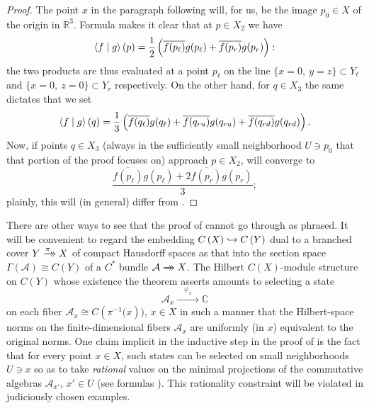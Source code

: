\documentclass[11pt,leqno]{article}
\theoremstyle{plain}
\theoremstyle{plain}
\theoremstyle{plain}
\numberwithin{equation}{section}
\theoremstyle{nonumberplain}
\newtheorem{proof}{Proof}
\newcommand\bC{{\mathbb C}}
\newcommand\bR{{\mathbb R}}
\newcommand\cA{{\mathcal A}}
\newcommand\1{{\bf 1}}
\newcommand{\xrightarrowdbl}[2][]{%
  \xrightarrow[#1]{#2}\mathrel{\mkern-14mu}\rightarrow
}
\begin{document}
\begin{proof}
  The point $x$ in the paragraph following \cite[(5)]{pt_brnch} will, for us, be the image $p_0\in X$ of the origin in $\bR^3$. Formula \cite[(6)]{pt_brnch} makes it clear that at $p\in X_2$ we have
  \begin{equation}\label{eq:2pts}
    \braket{f\mid g}(p) = \frac 12\left(\overline{f(p_{\ell})}g(p_{\ell}) + \overline{f(p_r)}g(p_r)\right):
  \end{equation}
  the two products are thus evaluated at a point $p_{\ell}$ on the line $\{x=0,\ y=z\}\subset Y_{\ell}$ and $\{x=0,\ z=0\}\subset Y_r$ respectively. On the other hand, for $q\in X_3$ the same \cite[(6)]{pt_brnch} dictates that we set
  \begin{equation}\label{eq:3pts}
    \braket{f\mid g}(q)
    =
    \frac 13\left(\overline{f(q_{\ell})}g(q_{\ell}) + \overline{f(q_{ru})}g(q_{ru}) + \overline{f(q_{rd})}g(q_{rd})\right).
  \end{equation}
  Now, if points $q\in X_3$ (always in the sufficiently small neighborhood $U\ni p_0$ that that portion of the proof focuses on) approach $p\in X_2$,  will converge to
  \begin{equation*}
    \frac{\overline{f(p_{\ell})}g(p_{\ell}) + 2\overline{f(p_r)}g(p_r)}{3};
  \end{equation*}
  plainly, this will (in general) differ from . 
\end{proof}

There are other ways to see that the proof of \cite[Theorem 4.3]{pt_brnch} cannot go through as phrased. It will be convenient to regard the embedding $C\left(X\right)\lhook\joinrel\to C\left(Y\right)$ dual to a branched cover $Y\xrightarrowdbl{\pi} X$ of compact Hausdorff spaces as that into the section space $\Gamma(\cA)\cong C\left(Y\right)$ of a $C^*$ bundle $\cA\xrightarrowdbl{}X$. The Hilbert $C\left(X\right)$-module structure on $C\left(Y\right)$ whose existence the theorem asserts amounts to selecting a state
\begin{equation*}
  \cA_x
  \xrightarrow{\quad\varphi_x\quad}
  \bC
\end{equation*}
on each fiber $\cA_x\cong C\left(\pi^{-1}(x\right))$, $x\in X$ in such a manner that the Hilbert-space norms on the finite-dimensional fibers $\cA_x$ are uniformly (in $x$) equivalent to the original norms. One claim implicit in the inductive step in the proof of \cite[Theorem 4.3]{pt_brnch} is the fact that for every point $x\in X$, such states can be selected on small neighborhoods $U\ni x$ so as to take {\it rational} values on the minimal projections of the commutative algebras $\cA_{x'}$, $x'\in U$ (see formulas \cite[(5), (6) and (7)]{pt_brnch}). This rationality constraint will be violated in judiciously chosen examples.
\end{document}

